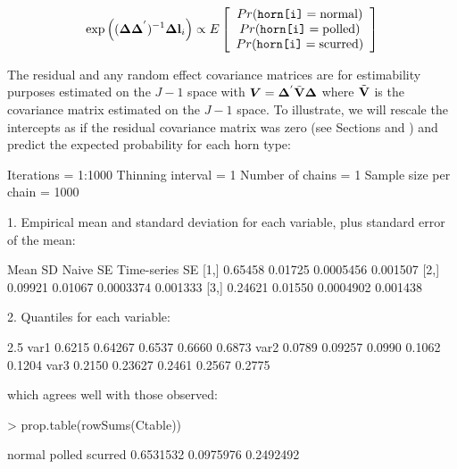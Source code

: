\documentclass{article}
\begin{document}
\begin{equation}
\textrm{exp}\left(({\bm \Delta}{\bm \Delta}^{'})^{-1}{\bm \Delta}{\bf l}_{i}\right) \propto E\left[\begin{array}{c} Pr(\texttt{horn[i]}=\textrm{normal})\\ Pr(\texttt{horn[i]}=\textrm{polled})\\ Pr(\texttt{horn[i]}=\textrm{scurred}) \end{array} \right]
\end{equation}

The residual and any random effect covariance matrices are for estimability purposes estimated on the $J-1$ space with  ${\bm V}={\bm \Delta}^{'}\tilde{\bf V}{\bm \Delta}$ where $\tilde{\bf V}$ is the covariance matrix estimated on the $J-1$ space. To illustrate, we will rescale the intercepts as if the residual covariance matrix was zero (see Sections and \label{pred-sec} \label{cat-sec}) and predict the expected probability for each horn type:

\begin{Schunk}
\begin{Soutput}
Iterations = 1:1000
Thinning interval = 1 
Number of chains = 1 
Sample size per chain = 1000 

1. Empirical mean and standard deviation for each variable,
   plus standard error of the mean:

        Mean      SD  Naive SE Time-series SE
[1,] 0.65458 0.01725 0.0005456       0.001507
[2,] 0.09921 0.01067 0.0003374       0.001333
[3,] 0.24621 0.01550 0.0004902       0.001438

2. Quantiles for each variable:

       2.5%
var1 0.6215 0.64267 0.6537 0.6660 0.6873
var2 0.0789 0.09257 0.0990 0.1062 0.1204
var3 0.2150 0.23627 0.2461 0.2567 0.2775
\end{Soutput}
\end{Schunk}

which agrees well with those observed:

\begin{Schunk}
\begin{Sinput}
> prop.table(rowSums(Ctable))
\end{Sinput}
\begin{Soutput}
   normal    polled   scurred 
0.6531532 0.0975976 0.2492492 
\end{Soutput}
\end{Schunk}
\end{document}
